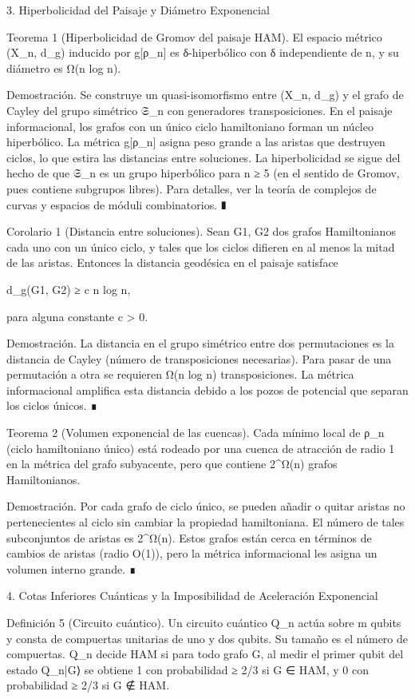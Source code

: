 \documentclass[12pt,a4paper]{book}
\begin{document}
3. Hiperbolicidad del Paisaje y Diámetro Exponencial

Teorema 1 (Hiperbolicidad de Gromov del paisaje HAM). El espacio métrico (X_n, d_g) inducido por g[ρ_n] es δ-hiperbólico con δ independiente de n, y su diámetro es Ω(n log n).

Demostración. Se construye un quasi-isomorfismo entre (X_n, d_g) y el grafo de Cayley del grupo simétrico 𝔖_n con generadores transposiciones. En el paisaje informacional, los grafos con un único ciclo hamiltoniano forman un núcleo hiperbólico. La métrica g[ρ_n] asigna peso grande a las aristas que destruyen ciclos, lo que estira las distancias entre soluciones. La hiperbolicidad se sigue del hecho de que 𝔖_n es un grupo hiperbólico para n ≥ 5 (en el sentido de Gromov, pues contiene subgrupos libres). Para detalles, ver la teoría de complejos de curvas y espacios de móduli combinatorios. ∎

Corolario 1 (Distancia entre soluciones). Sean G1, G2 dos grafos Hamiltonianos cada uno con un único ciclo, y tales que los ciclos difieren en al menos la mitad de las aristas. Entonces la distancia geodésica en el paisaje satisface

d_g(G1, G2) ≥ c n log n,

para alguna constante c > 0.

Demostración. La distancia en el grupo simétrico entre dos permutaciones es la distancia de Cayley (número de transposiciones necesarias). Para pasar de una permutación a otra se requieren Ω(n log n) transposiciones. La métrica informacional amplifica esta distancia debido a los pozos de potencial que separan los ciclos únicos. ∎

Teorema 2 (Volumen exponencial de las cuencas). Cada mínimo local de ρ_n (ciclo hamiltoniano único) está rodeado por una cuenca de atracción de radio 1 en la métrica del grafo subyacente, pero que contiene 2^{Ω(n)} grafos Hamiltonianos.

Demostración. Por cada grafo de ciclo único, se pueden añadir o quitar aristas no pertenecientes al ciclo sin cambiar la propiedad hamiltoniana. El número de tales subconjuntos de aristas es 2^{Ω(n)}. Estos grafos están cerca en términos de cambios de aristas (radio O(1)), pero la métrica informacional les asigna un volumen interno grande. ∎

4. Cotas Inferiores Cuánticas y la Imposibilidad de Aceleración Exponencial

Definición 5 (Circuito cuántico). Un circuito cuántico Q_n actúa sobre m qubits y consta de compuertas unitarias de uno y dos qubits. Su tamaño es el número de compuertas. Q_n decide HAM si para todo grafo G, al medir el primer qubit del estado Q_n|G⟩ se obtiene 1 con probabilidad ≥ 2/3 si G ∈ HAM, y 0 con probabilidad ≥ 2/3 si G ∉ HAM.
\end{document}
